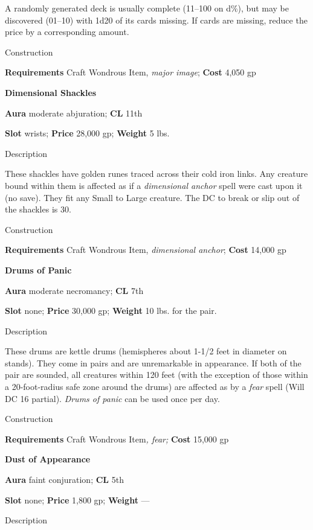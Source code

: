 A randomly generated deck is usually complete (11--100 on d\%), but may be discovered (01--10) with 1d20 of its cards missing. If cards are missing, reduce the price by a corresponding amount. 
				
Construction
				
\textbf{Requirements} Craft Wondrous Item, \textit{major image}; \textbf{Cost }4,050 gp
				
\textbf{Dimensional Shackles}
				
\textbf{Aura} moderate abjuration;\textbf{ CL }11th
				
\textbf{Slot} wrists; \textbf{Price} 28,000 gp; \textbf{Weight} 5 lbs.
				
Description
				
These shackles have golden runes traced across their cold iron links. Any creature bound within them is affected as if a \textit{dimensional anchor }spell were cast upon it (no save). They fit any Small to Large creature. The DC to break or slip out of the shackles is 30. 
				
Construction
				
\textbf{Requirements} Craft Wondrous Item, \textit{dimensional anchor}; \textbf{Cost }14,000 gp
				
\textbf{Drums of Panic}
				
\textbf{Aura} moderate necromancy;\textbf{ CL }7th
				
\textbf{Slot} none; \textbf{Price} 30,000 gp; \textbf{Weight} 10 lbs. for the pair.
				
Description
				
These drums are kettle drums (hemispheres about 1-1/2 feet in diameter on stands). They come in pairs and are unremarkable in appearance. If both of the pair are sounded, all creatures within 120 feet (with the exception of those within a 20-foot-radius safe zone around the drums) are affected as by a \textit{fear} spell (Will DC 16 partial). \textit{Drums of panic} can be used once per day. 
				
Construction
				
\textbf{Requirements} Craft Wondrous Item\textit{, fear; }\textbf{Cost }15,000 gp
				
\textbf{Dust of Appearance}
				
\textbf{Aura} faint conjuration;\textbf{ CL }5th
				
\textbf{Slot} none; \textbf{Price} 1,800 gp; \textbf{Weight }---
				
Description
				
